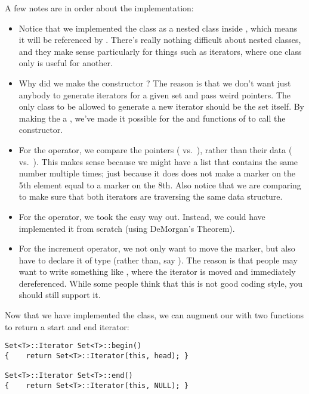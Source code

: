A few notes are in order about the implementation:
\begin{itemize}
\item Notice that we implemented the class as a nested class inside
  , which means it will be referenced by
  . There's really nothing difficult about
  nested classes, and they make sense particularly for things such as
  iterators, where one class only is useful for another.
\item Why did we make the constructor ? The reason is
  that we don't want just anybody to generate iterators for a given
  set and pass weird pointers. The only class to be allowed to
  generate a new iterator should be the set itself. By making the
   a , we've made it possible for the
   and  functions of  to call
  the constructor.
\item For the \code{==} operator, we compare the pointers
  ( vs.~), rather than their data
  ( vs.~).
  This makes sense because we might have a list that contains the same
  number multiple times; just because it does does not make a marker
  on the 5th element equal to a marker on the 8th.
  Also notice that we are comparing to make sure that both iterators
  are traversing the same data structure.
\item For the \code{!=} operator, we took the easy way out. 
  Instead, we could have implemented it from scratch (using DeMorgan's Theorem).
\item For the increment operator, we not only want to move the marker,
  but also have to declare it of type  (rather than,
  say ). The reason is that people may want to write
  something like , where the iterator is moved
  and immediately dereferenced. While some people
  think that this is not good coding style, you should still support
  it.
\end{itemize}

Now that we have implemented the  class, we can
augment our  with two functions to return a start and
end iterator:

\begin{verbatim}
Set<T>::Iterator Set<T>::begin()
{    return Set<T>::Iterator(this, head); }

Set<T>::Iterator Set<T>::end()
{    return Set<T>::Iterator(this, NULL); }
\end{verbatim}

